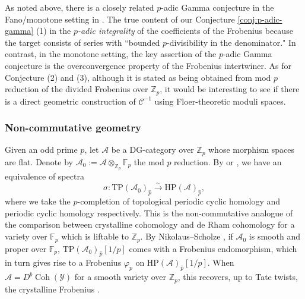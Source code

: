 \documentclass[reqno]{amsart}
\numberwithin{equation}{section}
\numberwithin{equation}{section}
\numberwithin{equation}{section}
\theoremstyle{definition}
\theoremstyle{remark}
\theoremstyle{remark}
\begin{document}
As noted above, there is a closely related $p$-adic Gamma conjecture in the Fano/monotone setting in \cite{bai2025p}. The true content of our Conjecture \ref{conj:p-adic-gamma} (1) in the \emph{$p$-adic integrality} of the coefficients of the Frobenius because the target consists of series with ``bounded $p$-divisibility in the denominator." In contrast, in the monotone setting, the key assertion of the $p$-adic Gamma conjecture is the overconvergence property of the Frobenius intertwiner. As for Conjecture (2) and (3), although it is stated as being obtained from mod $p$ reduction of the divided Frobenius over $\mathbb{Z}_p$, it would be interesting to see if there is a direct geometric construction of $\mathcal{C}^{-1}$ using Floer-theoretic moduli spaces.

\subsubsection{Non-commutative geometry}
 Given an odd prime $p$, let $\mathcal{A}$ be a DG-category over $\mathbb{Z}_p$ whose morphism spaces are flat. Denote by $\mathcal{A}_0 := \mathcal{A} \otimes_{\mathbb{Z}_p} \mathbb{F}_p$ the mod $p$ reduction. By \cite[Theorem 1]{petrov2019periodic} or \cite[Theorem 0.5.1]{raksitsanath}, we have an equivalence of spectra
\begin{equation}\label{eqn:nc-crys-dR}
   \sigma: \mathrm{TP}(\mathcal{A}_0)_{\hat{p}} \xrightarrow{\sim} \mathrm{HP}(\mathcal{A})_{\hat{p}}, 
\end{equation}
where we take the $p$-completion of topological periodic cyclic homology and periodic cyclic homology respectively. This is the non-commutative analogue of the comparison between crystalline cohomology and de Rham cohomology for a variety over $\mathbb{F}_p$ which is liftable to $\mathbb{Z}_p$. By Nikolaus--Scholze \cite{nikolaus-scholze}, if $\mathcal{A}_0$ is smooth and proper over $\mathbb{F}_p$, $\mathrm{TP}(\mathcal{A}_0)_{\hat{p}}[1/p]$ comes with a Frobenius endomorphism, which in turn gives rise to a Frobenius $\varphi_p$ on $\mathrm{HP}(\mathcal{A})_{\hat{p}}[1/p]$. When $\mathcal{A}=D^b\operatorname{Coh}(\mathcal{Y})$ for a smooth variety over $\mathbb{Z}_p$, this recovers, up to Tate twists, the crystalline Frobenius \cite[\S 6]{tabuadaweil}. 
\end{document}
